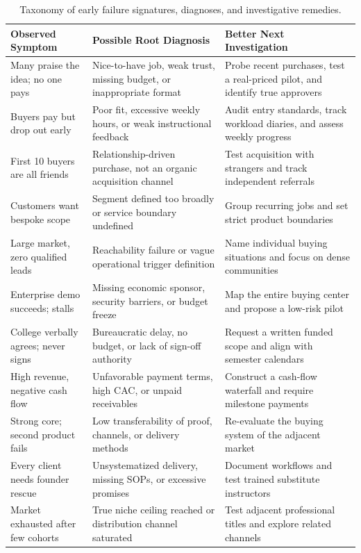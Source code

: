 \begin{table}[t]
\centering
\small
\begin{tabularx}{\textwidth}{p{4.2cm} p{4.8cm} X}
\toprule
\textbf{Observed Symptom} & \textbf{Possible Root Diagnosis} & \textbf{Better Next Investigation} \\
\midrule
Many praise the idea; no one pays & Nice-to-have job, weak trust, missing budget, or inappropriate format & Probe recent purchases, test a real-priced pilot, and identify true approvers \\
Buyers pay but drop out early & Poor fit, excessive weekly hours, or weak instructional feedback & Audit entry standards, track workload diaries, and assess weekly progress \\
First 10 buyers are all friends & Relationship-driven purchase, not an organic acquisition channel & Test acquisition with strangers and track independent referrals \\
Customers want bespoke scope & Segment defined too broadly or service boundary undefined & Group recurring jobs and set strict product boundaries \\
Large market, zero qualified leads & Reachability failure or vague operational trigger definition & Name individual buying situations and focus on dense communities \\
Enterprise demo succeeds; stalls & Missing economic sponsor, security barriers, or budget freeze & Map the entire buying center and propose a low-risk pilot \\
College verbally agrees; never signs & Bureaucratic delay, no budget, or lack of sign-off authority & Request a written funded scope and align with semester calendars \\
High revenue, negative cash flow & Unfavorable payment terms, high CAC, or unpaid receivables & Construct a cash-flow waterfall and require milestone payments \\
Strong core; second product fails & Low transferability of proof, channels, or delivery methods & Re-evaluate the buying system of the adjacent market \\
Every client needs founder rescue & Unsystematized delivery, missing SOPs, or excessive promises & Document workflows and test trained substitute instructors \\
Market exhausted after few cohorts & True niche ceiling reached or distribution channel saturated & Test adjacent professional titles and explore related channels \\
\bottomrule
\end{tabularx}
\caption{Taxonomy of early failure signatures, diagnoses, and investigative remedies.}
\label{tab:ch7-failure-signatures}
\end{table}
